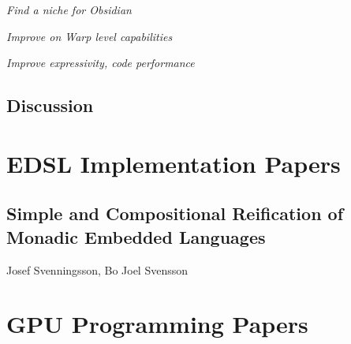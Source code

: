 \documentclass[a4paper]{book}
\newcommand{\paperBB}{Simple and Compositional Reification of Monadic Embedded Languages}
\begin{document}
\noindent\emph{Find a niche for Obsidian} 

\noindent\emph{Improve on Warp level capabilities} 

\noindent\emph{Improve expressivity, code performance} 

\section{Discussion} 






\clearpage{}

%
%


\chapter{EDSL Implementation Papers}
\label{chap:EDSLImplementation}
% 
\cleardoublepage 


\section{\paperBB}
\label{sec:paperBB}

\begin{center} 
Josef Svenningsson, Bo Joel Svensson
\end{center}






\chapter{GPU Programming Papers}
\label{chap:GPUProgramming}

% 
\cleardoublepage 
\end{document}
